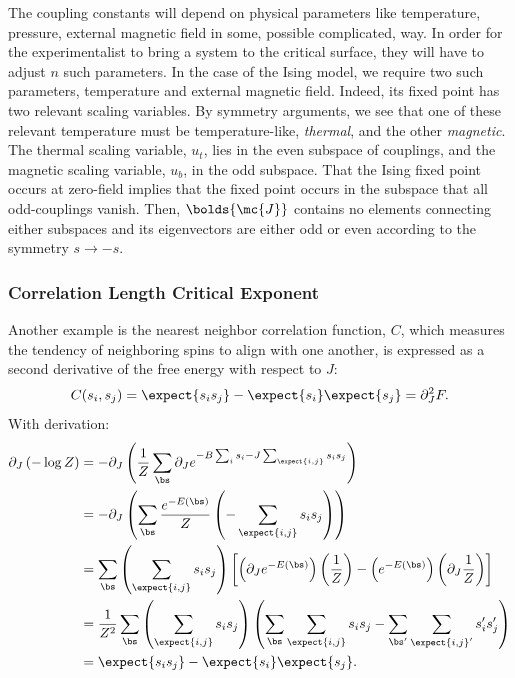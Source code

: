 The coupling constants will depend on physical parameters like
temperature, pressure, external magnetic field in some, possible
complicated, way. In order for the experimentalist to bring a system
to the critical surface, they will have to adjust $n$ such
parameters. In the case of the Ising model, we require two such
parameters, temperature and external magnetic field. Indeed, its fixed
point has two relevant scaling variables. By symmetry arguments, we
see that one of these relevant temperature must be temperature-like,
\textit{thermal}, and the other \textit{magnetic}. The thermal scaling
variable, $u_t$, lies in the even subspace of couplings, and the
magnetic scaling variable, $u_b$, in the odd subspace. That the Ising
fixed point occurs at zero-field implies that the fixed point occurs
in the subspace that all odd-couplings vanish. Then, $\bolds{\mc{J}}$
contains no elements connecting either subspaces and its eigenvectors
are either odd or even according to the symmetry $s \rightarrow -s$.
\subsubsection{Correlation Length Critical Exponent}


Another example is the nearest neighbor correlation function, $C$,
which measures the tendency of neighboring spins to align with one
another, is expressed as a second derivative of the free energy with
respect to $J$:
\begin{equation}%
  C(s_i,s_j)=\expect{s_is_j}-\expect{s_i}\expect{s_j}=\partial_J^2 F.
\end{equation}%
With derivation:
\begin{align}
  \partial_J \left(-\log Z\right) &=-\partial_J\left(\frac{1}{Z}\sum_{\bs}\partial_J e^{-B \sum_i s_i - J \sum_{\expect{i,j}} s_i s_j} \right)\\
                                  &=-\partial_J\left(\sum_{\bs} \frac{e^{-E(\bs)}}{Z} \left(-\sum_{\expect{i,j}} s_i s_j\right)\right)\\
                                  &=\sum_{\bs}\left(\sum_{\expect{i,j}} s_i s_j\right)
                                    \left[\left(\partial_J e^{-E(\bs)}\right)\left(\frac{1}{Z} \right)-\left(e^{-E(\bs)}\right)\left(\partial_J \frac{1}{Z}\right)\right]\\
                                  &=\frac{1}{Z^2}\sum_{\bs}\left(\sum_{\expect{i,j}} s_i s_j\right)\left(\sum_{\bs} \sum_{\expect{i,j}} s_i s_j-\sum_{\bs'} \sum_{\expect{i,j}'} s_i' s_j'\right)\\
                                  &= \expect{s_i s_j}-\expect{s_i} \expect{s_j}.
\end{align}%

